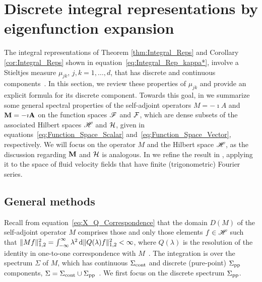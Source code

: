 \documentclass[amsa]{ipart}
\begin{document}
\section{Discrete integral representations by eigenfunction
  expansion} \label{app:Eig_Funct_Exp}  
%
The integral representations of Theorem \ref{thm:Integral_Reps} and
Corollary \ref{cor:Integral_Reps} 
shown in equation~\eqref{eq:Integral_Rep_kappa*},  involve a
Stieltjes measure $\mu_{jk}$, $j,k=1,\ldots,d$, that has discrete and
continuous components~\cite{Reed-1980,Stone:64}. In this section, we
review these properties of $\mu_{jk}$ and provide an explicit formula
for its discrete component. Towards this goal, in
 we summarize some general spectral properties
of the self-adjoint operators $M=-\imath A$ and $\mathbf{M}=-\imath\mathbf{A}$ on the function
spaces $\mathscr{F}$ and $\mathcal{F}$, which are dense subsets of the associated
Hilbert spaces $\mathscr{H}$ and $\mathcal{H}$, given in
equations~\eqref{eq:Function_Space_Scalar}
and~\eqref{eq:Function_Space_Vector}, respectively. We will focus on
the operator $M$ and the Hilbert space $\mathscr{H}$, as the discussion
regarding $\mathbf{M}$ and $\mathcal{H}$ is analogous. In
 we refine the result in
, applying it to the space of fluid velocity
fields that have finite (trigonometric) Fourier series.  




\subsection{General methods}\label{eq:Gen_Methods}
%
Recall from equation~\eqref{eq:X_Q_Correspondence} that the domain
$D(M)$ of the self-adjoint operator $M$ comprises those and only those
elements $f\in\mathscr{H}$ such that $\|Mf\|_{1,2}^2=\int_{-\infty}^\infty\lambda^2\,\mathrm{d}\|Q(\lambda)f\|_{1,2}^2<\infty$,
where $Q(\lambda)$ is the resolution of the identity in one-to-one
correspondence with $M$~\cite{Stone:64}. The integration is over the
spectrum $\Sigma$ of $M$, which has continuous $\Sigma_{\text{cont}}$ and discrete
(pure-point) $\Sigma_{\text{pp}}$ components,
$\Sigma=\Sigma_{\text{cont}}\cup\Sigma_{\text{pp}}$~\cite{Reed-1980,Stone:64}. We first focus on
the discrete spectrum $\Sigma_{\text{pp}}$.
\end{document}
